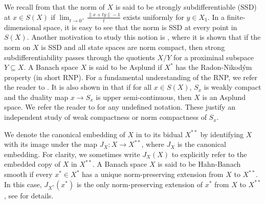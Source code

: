 \documentclass[12pt]{amsart}
\theoremstyle{definition}
\numberwithin{equation}{section}
\begin{document}
We recall from \cite{FP} that the norm of $X$ is said to be strongly subdifferentiable (SSD) at $x\in S(X)$ if $\lim _{t\to 0^+}\frac{\|x+ty\|-1}{t}$ exists uniformly for $y\in X_1$. In a finite-dimensional space, it is easy to see that the norm is SSD at every point in $S(X)$. Another motivation to study this notion is \cite[Proposition~2.7]{FP}, where it is shown that if the norm on $X$ is SSD and all state spaces are norm compact, then strong subdifferentiability passes through the quotients ${X}/{Y}$ for a proximinal subspace $Y\subseteq X$. A Banach space $X$ is said to be Asplund if $X^*$ has the Radon-Nikod\'ym property (in short RNP). For a fundamental understanding of the RNP, we refer the reader to \cite{DU}. It is also shown in \cite{GGS} that if for all $x\in S({X})$, $S_{x}$ is weakly compact and the duality map $x\to S_x$ is upper semi-continuous, then $X$ is an Asplund space. We refer the reader to \cite{GGS} for any undefined notation. These justify an independent study of weak compactness or norm compactness of $S_{x}$.


We denote the canonical embedding of $X$ in to its bidual $X^{**}$ by identifying $X$ with its image under the map $J_{X}:X\to X^{**}$, where $J_{X}$ is the canonical embedding. For clarity, we sometimes write $J_{X}(X)$ to explicitly refer to the embedded copy of $X$ in $X^{**}$.
A Banach space $X$ is said to be Hahn-Banach smooth if every $x^*\in X^*$ has a unique norm-preserving extension from $X$ to $X^{**}$. In this case, $J_{X^*}(x^*)$ is the only norm-preserving extension of $x^*$ from $X$ to $X^{**}$, see \cite{SF} for details.
\end{document}
